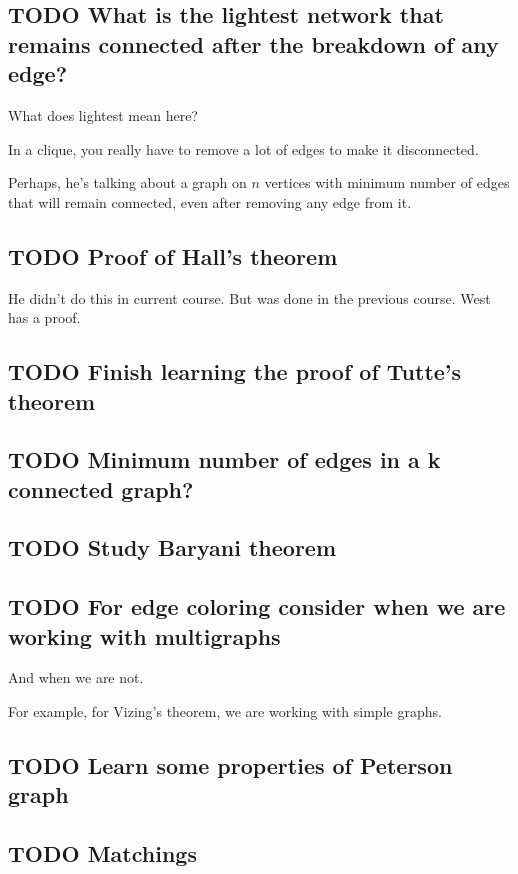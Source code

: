 \documentclass[11pt]{article}
\begin{document}
\subsection{{\bfseries\sffamily TODO} What is the lightest network that remains connected after the breakdown of any edge?}
\label{sec:org9acbf7d}
What does lightest mean here? 

In a clique, you really have to remove a lot of edges to make it disconnected.

Perhaps, he's talking about a graph on \(n\) vertices with minimum number of
edges that will remain connected, even after removing any edge from it.
\subsection{{\bfseries\sffamily TODO} Proof of Hall's theorem}
\label{sec:org7f68e0e}
He didn't do this in current course. But was done in the previous course.
West has a proof.
\subsection{{\bfseries\sffamily TODO} Finish learning the proof of Tutte's theorem}
\label{sec:org949edcc}
\subsection{{\bfseries\sffamily TODO} Minimum number of edges in a k connected graph?}
\label{sec:org46d3708}
\subsection{{\bfseries\sffamily TODO} Study Baryani theorem}
\label{sec:org21281ad}
\subsection{{\bfseries\sffamily TODO} For edge coloring consider when we are working with multigraphs}
\label{sec:orgf3879d6}
And when we are not.

For example, for Vizing's theorem, we are working with simple graphs.
\subsection{{\bfseries\sffamily TODO} Learn some properties of Peterson graph}
\label{sec:orgd610d14}
\subsection{{\bfseries\sffamily TODO} Matchings}
\label{sec:org621d462}
\end{document}
